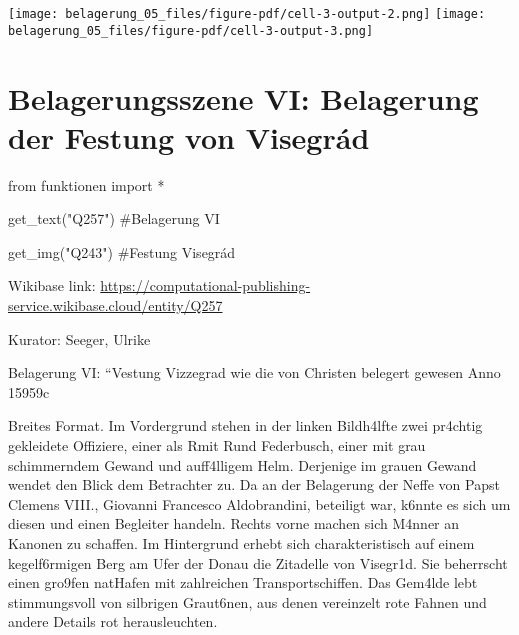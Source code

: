 \documentclass[
  a4paper,
  portrait]{book}
\newenvironment{Shaded}{\begin{snugshade}}{\end{snugshade}}
\newcommand{\CommentTok}[1]{\textcolor[rgb]{0.37,0.37,0.37}{#1}}
\newcommand{\ImportTok}[1]{\textcolor[rgb]{0.00,0.46,0.62}{#1}}
\newcommand{\NormalTok}[1]{\textcolor[rgb]{0.00,0.23,0.31}{#1}}
\newcommand{\OperatorTok}[1]{\textcolor[rgb]{0.37,0.37,0.37}{#1}}
\newcommand{\StringTok}[1]{\textcolor[rgb]{0.13,0.47,0.30}{#1}}
\begin{document}
\texttt{[image: belagerung\_05\_files/figure-pdf/cell-3-output-2.png]}
\texttt{[image: belagerung\_05\_files/figure-pdf/cell-3-output-3.png]}

\chapter{Belagerungsszene VI: Belagerung der Festung von
Visegrád}\label{belagerungsszene-vi-belagerung-der-festung-von-visegruxe1d}

\begin{Shaded}
\begin{Highlighting}[]
\ImportTok{from}\NormalTok{ funktionen }\ImportTok{import} \OperatorTok{*}
\end{Highlighting}
\end{Shaded}

\begin{Shaded}
\begin{Highlighting}[]
\NormalTok{get\_text(}\StringTok{"Q257"}\NormalTok{)}
\CommentTok{\#Belagerung VI}

\NormalTok{get\_img(}\StringTok{"Q243"}\NormalTok{)}
\CommentTok{\#Festung Visegrád}
\end{Highlighting}
\end{Shaded}

Wikibase link:
\url{https://computational-publishing-service.wikibase.cloud/entity/Q257}

Kurator: Seeger, Ulrike

Belagerung VI: ``Vestung Vizzegrad wie die von Christen belegert gewesen
Anno 1595\x9c

Breites Format. Im Vordergrund stehen in der linken Bildh\xa4lfte
zwei pr\xa4chtig gekleidete Offiziere, einer als
R\xbcckenfigur mit R\xbcstung und Federbusch, einer mit grau
schimmerndem Gewand und auff\xa4lligem Helm. Derjenige im grauen
Gewand wendet den Blick dem Betrachter zu. Da an der Belagerung der
Neffe von Papst Clemens VIII., Giovanni Francesco Aldobrandini,
beteiligt war, k\xb6nnte es sich um diesen und einen Begleiter
handeln. Rechts vorne machen sich M\xa4nner an Kanonen zu schaffen.
Im Hintergrund erhebt sich charakteristisch auf einem
kegelf\xb6rmigen Berg am Ufer der Donau die Zitadelle von
Visegr\xa1d. Sie beherrscht einen gro\x9fen
nat\xbcrlichen Hafen mit zahlreichen Transportschiffen. Das
Gem\xa4lde lebt stimmungsvoll von silbrigen Graut\xb6nen, aus
denen vereinzelt rote Fahnen und andere Details rot herausleuchten.
\end{document}
